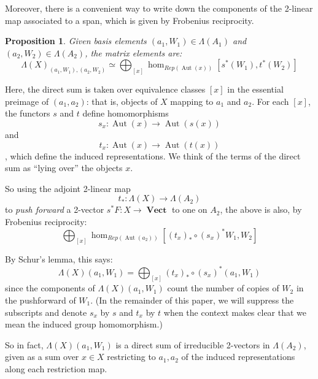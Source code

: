 \documentclass[10pt]{amsart}
\numberwithin{theorem}{subsection}
\newtheorem{proposition}[theorem]{Proposition}
\newcommand{\ra}{\mathop{\rightarrow}}
\newcommand{\opname}[1]{\operatorname{#1}}
\newcommand{\catname}[1]{\boldsymbol{\opname{{#1}}}}
\newcommand{\V}{\catname{Vect}}
\newcommand{\FV}{\Lambda}
\begin{document}
Moreover, there is a convenient way to write down the components of
the 2-linear map associated to a span, which is given by Frobenius
reciprocity.

\begin{proposition}Given basis elements $(a_1,W_1) \in \FV(A_1)$ and
$(a_2,W_2) \in \FV(A_2)$, the matrix elements are:
\begin{equation}\label{eq:frobenius} 
\FV(X)_{(a_1,W_1),(a_2,W_2)} \simeq \bigoplus_{[x]} \opname{hom}_{Rep(\opname{Aut}(x))}[s^{\ast}(W_1),t^{\ast}(W_2)]
\end{equation} \end{proposition}

Here, the direct sum is taken over equivalence classes $[x]$ in the
essential preimage of $(a_1,a_2)$: that is, objects of $X$ mapping to
$a_1$ and $a_2$.  For each $[x]$, the functors $s$ and $t$ define
homomorphisms
\begin{equation}
s_x : \opname{Aut}(x) \ra \opname{Aut}(s(x))
\end{equation}
and
\begin{equation}
t_x : \opname{Aut}(x) \ra \opname{Aut}(t(x))
\end{equation}, which define the induced representations.  We
think of the terms of the direct sum as ``lying over'' the objects
$x$.

So using the adjoint 2-linear map
\begin{equation}
t_{\ast} : \FV(X) \ra \FV(A_2)
\end{equation}
to \textit{push forward} a 2-vector $s^{\ast}F : X \ra \V$ to one
on $A_2$, the above is also, by Frobenius reciprocity:
\begin{equation}
\bigoplus_{[x]} \opname{hom}_{Rep(\opname{Aut}(a_2))}[(t_x)_{\ast} \circ (s_x)^{\ast} W_1 , W_2]
\end{equation}

By Schur's lemma, this says:
\begin{equation}
  \FV(X)(a_1,W_1) = \bigoplus_{[x]} (t_x)_{\ast} \circ (s_x)^{\ast} (a_1,W_1)
\end{equation}
since the components of $\FV(X)(a_1,W_1)$ count the number of copies
of $W_2$ in the pushforward of $W_1$.  (In the remainder of this
paper, we will suppress the subscripts and denote $s_x$ by $s$ and
$t_x$ by $t$ when the context makes clear that we mean the induced
group homomorphism.)

So in fact, $\FV(X)(a_1,W_1)$ is a direct sum of irreducible 2-vectors in
$\FV(A_2)$, given as a sum over $x \in X$ restricting to $a_1, a_2$
of the induced representations along each restriction map.
\end{document}
